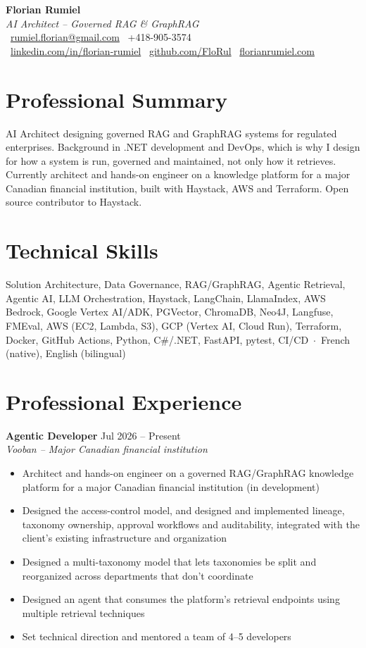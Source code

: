 ﻿\documentclass[10pt,letterpaper]{article}
\begin{document}
\begin{center}
  {\LARGE\textbf{Florian Rumiel}} \\[0.2em]
  {\large\textit{AI Architect -- Governed RAG \& GraphRAG}} \\[0.2em]
  \faEnvelope\ \href{mailto:rumiel.florian@gmail.com}{rumiel.florian@gmail.com}
  \quad \faPhone\ +418-905-3574 \\
  \faLinkedin\ \href{https://linkedin.com/in/florian-rumiel}{linkedin.com/in/florian-rumiel}
  \quad \faGithub\ \href{https://github.com/FloRul}{github.com/FloRul}
  \quad \faGlobe\ \href{https://florianrumiel.com}{florianrumiel.com}
\end{center}

\section*{Professional Summary}
AI Architect designing governed RAG and GraphRAG systems for regulated enterprises. Background in .NET development and DevOps, which is why I design for how a system is run, governed and maintained, not only how it retrieves. Currently architect and hands-on engineer on a knowledge platform for a major Canadian financial institution, built with Haystack, AWS and Terraform. Open source contributor to Haystack.

\section*{Technical Skills}
Solution Architecture, Data Governance, RAG/GraphRAG, Agentic Retrieval, Agentic AI, LLM Orchestration,
Haystack, LangChain, LlamaIndex, AWS Bedrock, Google Vertex AI/ADK, PGVector, ChromaDB, Neo4J, Langfuse, FMEval,
AWS (EC2, Lambda, S3), GCP (Vertex AI, Cloud Run), Terraform, Docker, GitHub Actions,
Python, C\#/.NET, FastAPI, pytest, CI/CD
\,$\cdot$\, French (native), English (bilingual)

\section*{Professional Experience}
\textbf{Agentic Developer} \hfill Jul 2026 -- Present\\
\textit{Vooban -- Major Canadian financial institution}
\begin{itemize}[nosep]
\item Architect and hands-on engineer on a governed RAG/GraphRAG knowledge platform for a major Canadian financial institution (in development)
\item Designed the access-control model, and designed and implemented lineage, taxonomy ownership, approval workflows and auditability, integrated with the client's existing infrastructure and organization
\item Designed a multi-taxonomy model that lets taxonomies be split and reorganized across departments that don't coordinate
\item Designed an agent that consumes the platform's retrieval endpoints using multiple retrieval techniques
\item Set technical direction and mentored a team of 4--5 developers
\end{itemize}
\end{document}
